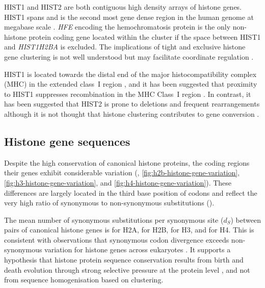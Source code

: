     HIST1 and HIST2 are both contiguous high density arrays of histone genes.
    HIST1 spans 
    and is the second most gene dense region in the human genome at
    megabase scale \citep{MHC-III-analysis}.
    \textit{HFE} encoding the hemochromatosis protein \citep{AlbigDoenecke1998}
    is the only non-histone protein coding gene located within the cluster
    if the space between HIST1 and \textit{HIST1H2BA} is excluded.
    The implications of tight and exclusive histone gene clustering
    is not well understood but may facilitate coordinate regulation
    \citep{Eirinlopez2009,close-regulators}.

    HIST1 is located towards the distal end of the major histocompatibility complex (MHC)
    in the extended class~I region \citep{MHC-I-transcript, MHC-complete-sequencing-1999},
    and it has been suggested that proximity to HIST1
    suppresses recombination in the MHC Class~I region \citep{MHC-repressed-by-HIST}.
    In contrast, it has been suggested that HIST2 is prone to
    deletions and frequent rearrangements
    \citep{HISTTwo-prone-deletion-discovery, HISTTwo-prone-deletion-focus}
    although it is not thought that histone clustering contributes to
    gene conversion \citep{NeiRooney2005}.

  \subsection{Histone gene sequences}
    Despite the high conservation of canonical histone proteins,
    the coding regions their genes exhibit considerable variation
    (, \ref{fig:h2b-histone-gene-variation},
    \ref{fig:h3-histone-gene-variation}, and \ref{fig:h4-histone-gene-variation}).
    These differences are largely located in the third base position of codons 
    and reflect the very high ratio of synonymous to non-synonymous
    substitutions ().

    The mean number of synonymous substitutions per synonymous site ($d_S$)
    between pairs of canonical histone genes is \MeanHTwoAdS{} for H2A,
    \MeanHTwoBdS{} for H2B, \MeanHThreedS for H3, and \MeanHFourdS{} for H4.
    This is consistent with observations that
    synonymous codon divergence exceeds non-synonymous variation
    for histone genes across eukaryotes \citep{Piontkivska2002, Rooney2002}.
    It supports a hypothesis that histone protein sequence conservation
    results from birth and death evolution through strong selective pressure
    at the protein level \citep{NeiRooney2005},
    and not from sequence homogenisation based on clustering.

